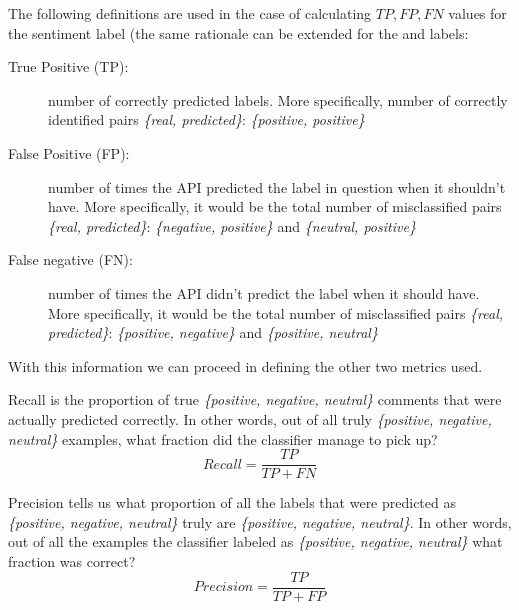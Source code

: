 \noindent The following definitions are used in the case of calculating $TP,FP,FN$ values for the  sentiment label (the same rationale can be extended for the  and  labels:
\begin{description}
 \item[True Positive (TP):] 
 number of correctly predicted labels. 
 More specifically, number of correctly identified pairs 
 \textit{\{real, predicted\}}: \textit{\{positive, positive\}}

 \item[False Positive (FP):]  
 number of times the API predicted the label in question when it shouldn't have.
 More specifically, it would be the total number of misclassified pairs 
 \textit{\{real, predicted\}}: \textit{\{negative, positive\}} and \textit{\{neutral, positive\}}

 \item[False negative (FN):] 
 number of times the API didn't predict the label when it should have. 
 More specifically, it would be the total number of misclassified pairs 
 \textit{\{real, predicted\}}: \textit{\{positive, negative\}} and \textit{\{positive, neutral\}}
\end{description}

With this information we can proceed in defining the other two metrics used.

Recall is the proportion of true \textit{\{positive, negative, neutral\}} comments that were actually predicted correctly. 
In other words, out of all truly \textit{\{positive, negative, neutral\}} examples, what fraction did the classifier manage to pick up?
\[Recall = \frac{TP}{TP + FN }\]


Precision tells us what proportion of all the labels that were predicted as \textit{\{positive, negative, neutral\}} truly are \textit{\{positive, negative, neutral\}}. 
In other words, out of all the examples the classifier labeled as \textit{\{positive, negative, neutral\}} what fraction was correct?
\[Precision = \frac{TP}{TP + FP }\]
